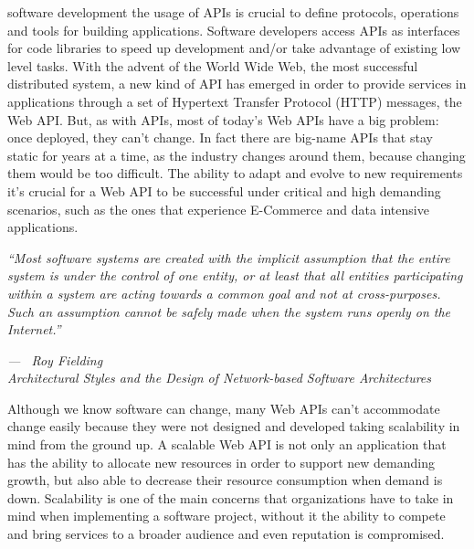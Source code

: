 \documentclass[10pt,article]{IEEEtran}
\begin{document}
% 
% 
% 
% 
 software development the usage of APIs is crucial to define protocols, operations and tools for building applications. Software developers access APIs as interfaces for code libraries to speed up development and/or take advantage of existing low level tasks. With the advent of the World Wide Web, the most successful distributed system, a new kind of API has emerged in order to provide services in applications through a set of Hypertext Transfer Protocol (HTTP) messages, the Web API. But, as with APIs, most of today's Web APIs have a big problem: once deployed, they can't change. In fact there are big-name APIs that stay static for years at a time, as the industry changes around them, because changing them would be too difficult\cite{RESTfulWebAPI:richardson}. The ability to adapt and evolve to new requirements it's crucial for a Web API to be successful under critical and high demanding scenarios, such as the ones that experience E-Commerce and data intensive applications.

 
\epigraph{{\textit{``Most software systems are created with the implicit assumption that the entire system is under the control of one entity, or at least that all entities participating within a system
are acting towards a common goal and not at cross-purposes. Such an assumption cannot
be safely made when the system runs openly on the Internet.''}}}{\textit{--- ~Roy Fielding \\ Architectural Styles and the Design of Network-based Software Architectures}}

Although we know software can change, many Web APIs can't accommodate change easily because they were not designed and developed taking scalability in mind from the ground up. A scalable Web API is not only an application that has the ability to allocate new resources in order to support new demanding growth, but also able to decrease their resource consumption when demand is down. Scalability is one of the main concerns that organizations have to take in mind when implementing a software project, without it the ability to compete and bring services to a broader audience and even reputation is compromised.
\end{document}
